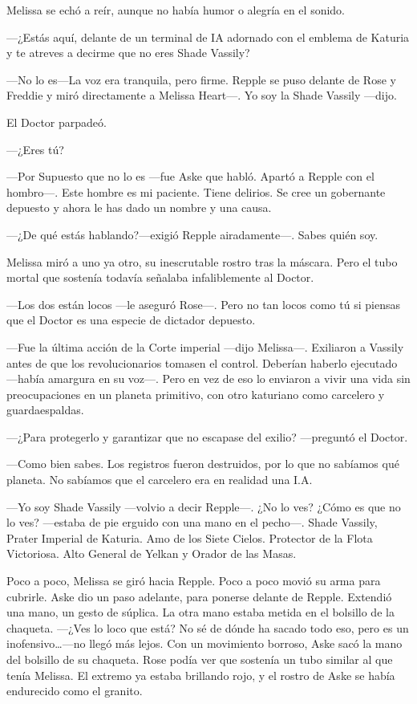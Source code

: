 {Melissa se echó a reír, aunque no había humor o alegría en el sonido.}

{---¿Estás aquí, delante de un terminal de IA adornado con el emblema de
Katuria y te atreves a decirme que no eres Shade Vassily?}

{---No lo es---La voz era tranquila, pero firme. Repple se puso delante
	de Rose y Freddie y miró directamente a Melissa Heart---. Yo soy la
Shade Vassily ---dijo.}

{El Doctor parpadeó.}

{---¿Eres tú?}

{---Por Supuesto que no lo es ---fue Aske que habló. Apartó a Repple con
	el hombro---. Este hombre es mi paciente. Tiene delirios. Se cree un
gobernante depuesto y ahora le has dado un nombre y una causa.}

{---¿De qué estás hablando?---exigió Repple airadamente---. Sabes quién
soy.}

{Melissa miró a uno ya otro, su inescrutable rostro tras la máscara.
	Pero el tubo mortal que sostenía todavía señalaba infaliblemente al
Doctor.}

{---Los dos están locos ---le aseguró Rose---. Pero no tan locos como tú
si piensas que el Doctor es una especie de dictador depuesto.}

{---Fue la última acción de la Corte imperial ---dijo Melissa---.
	Exiliaron a Vassily antes de que los revolucionarios tomasen el control.
	Deberían haberlo ejecutado ---había amargura en su voz---. Pero en vez
	de eso lo enviaron a vivir una vida sin preocupaciones en un planeta
primitivo, con otro katuriano como carcelero y guardaespaldas.}

{---¿Para protegerlo y garantizar que no escapase del exilio?
---preguntó el Doctor.}

{---Como bien sabes. Los registros fueron destruidos, por lo que no
	sabíamos qué planeta. No sabíamos que el carcelero era en realidad una
I.A.}

{---Yo soy Shade Vassily ---volvio a decir Repple---. ¿No lo ves? ¿Cómo
	es que no lo ves? ---estaba de pie erguido con una mano en el pecho---.
	Shade Vassily, Prater Imperial de Katuria. Amo de los Siete Cielos.
	Protector de la Flota Victoriosa. Alto General de Yelkan y Orador de las
Masas.}

{Poco a poco, Melissa se giró hacia Repple. Poco a poco movió su arma
	para cubrirle. Aske dio un paso adelante, para ponerse delante de
	Repple. Extendió una mano, un gesto de súplica. La otra mano estaba
	metida en el bolsillo de la chaqueta. ---¿Ves lo loco que está? No sé
	de dónde ha sacado todo eso, pero es un inofensivo\ldots{}---no llegó
	más lejos. Con un movimiento borroso, Aske sacó la mano del bolsillo de
	su chaqueta. Rose podía ver que sostenía un tubo similar al que tenía
	Melissa. El extremo ya estaba brillando rojo, y el rostro de Aske se
había endurecido como el granito.}

